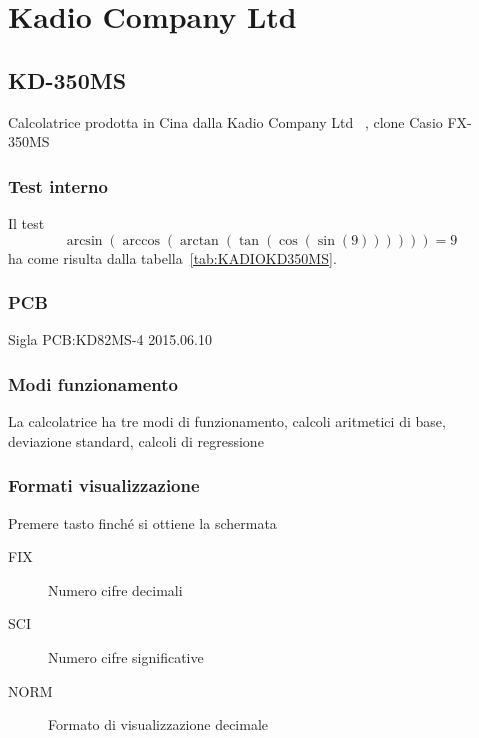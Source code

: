 \chapter{Kadio Company Ltd}
\section{KD-350MS}
Calcolatrice prodotta in Cina dalla Kadio Company Ltd~\cite{Wikipedia2021a} , clone Casio FX-350MS
\subsection{Test interno}
Il test\[\arcsin(\arccos(\arctan(\tan(\cos(\sin(9))))))=9\] ha come risulta dalla tabella~\vref{tab:KADIOKD350MS}. 
\subsection{PCB}
Sigla PCB:KD82MS-4 2015.06.10
\subsection{Modi funzionamento}
La calcolatrice ha tre modi di funzionamento, calcoli aritmetici di base, deviazione standard, calcoli di regressione
\subsection{Formati visualizzazione}
Premere tasto \tastomode finché si ottiene la schermata
\begin{center}
	\CASIOmodediplayexp
	
\end{center}
\begin{description}
	\item[ FIX]Numero cifre decimali
	\item[ SCI]Numero cifre significative
	\item[ NORM]Formato di visualizzazione decimale
\end{description}
